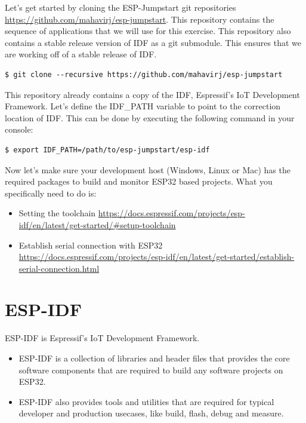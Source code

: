 \documentclass[11pt,fleqn]{book} %
\begin{document}
Let's get started by cloning the ESP-Jumpstart git repositories \url{https://github.com/mahavirj/esp-jumpstart}. This repository contains the sequence of applications that we will use for this exercise. This repository also contains a stable release version of IDF as a git submodule. This ensures that we are working off of a stable release of IDF.

\begin{verbatim}
$ git clone --recursive https://github.com/mahavirj/esp-jumpstart
\end{verbatim}

This repository already contains a copy of the IDF, Espressif's IoT Development Framework. Let's define the IDF\_PATH variable to point to the correction location of IDF. This can be done by executing the following command in your console:

\begin{verbatim}
$ export IDF_PATH=/path/to/esp-jumpstart/esp-idf
\end{verbatim}

Now let's make sure your development host (Windows, Linux or Mac) has the required packages to build and monitor ESP32 based projects. What you specifically need to do is:
\begin{itemize}
    \item Setting the toolchain \url{https://docs.espressif.com/projects/esp-idf/en/latest/get-started/#setup-toolchain}
    \item Establish serial connection with ESP32 \url{https://docs.espressif.com/projects/esp-idf/en/latest/get-started/establish-serial-connection.html}
\end{itemize}

\section{ESP-IDF}

ESP-IDF is Espressif's IoT Development Framework. 
\begin{itemize}
    \item ESP-IDF is a collection of libraries and header files that provides the core software components that are required to build any software projects on ESP32. 
    \item ESP-IDF also provides tools and utilities that are required for typical developer and production usecases, like build, flash, debug and measure.
\end{itemize}
\end{document}
